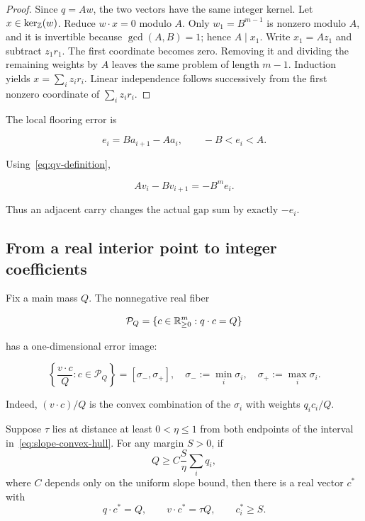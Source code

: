 \begin{proof}
  Since $q=Aw$, the two vectors have the same integer kernel.  Let
  $x\in\ker_{\mathbb{Z}}(w)$.  Reduce $w\cdot x=0$ modulo $A$.  Only
  $w_1=B^{m-1}$ is nonzero modulo $A$, and it is invertible because
  $\gcd(A,B)=1$; hence $A\mid x_1$.  Write $x_1=Az_1$ and subtract
  $z_1r_1$.  The first coordinate becomes zero.  Removing it and dividing the
  remaining weights by $A$ leaves the same problem of length $m-1$.  Induction
  yields $x=\sum_i z_ir_i$.  Linear independence follows successively from the
  first nonzero coordinate of $\sum_i z_ir_i$.
\end{proof}

The local flooring error is

\begin{equation}
  e_i=Ba_{i+1}-Aa_i,\qquad -B<e_i<A.
  \label{eq:local-error}
\end{equation}

Using~\eqref{eq:qv-definition},

\begin{equation}
  Av_i-Bv_{i+1}=-B^m e_i.
  \label{eq:carry-error}
\end{equation}

Thus an adjacent carry changes the actual gap sum by exactly $-e_i$.

\subsection{From a real interior point to integer coefficients}

Fix a main mass $Q$.  The nonnegative real fiber

\[
  \mathcal P_Q=\{c\in\mathbb{R}_{\ge0}^m:q\cdot c=Q\}
\]

has a one-dimensional error image:

\begin{equation}
  \left\{\frac{v\cdot c}{Q}:c\in\mathcal P_Q\right\}
  =[\sigma_-,\sigma_+],
  \quad
  \sigma_-:=\min_i\sigma_i,
  \quad
  \sigma_+:=\max_i\sigma_i.
  \label{eq:slope-convex-hull}
\end{equation}

Indeed, $(v\cdot c)/Q$ is the convex combination of the $\sigma_i$ with
weights $q_ic_i/Q$.

\begin{lemma}
  \label{lem:interior}
  Suppose $\tau$ lies at distance at least $0<\eta\le1$ from both endpoints of
  the interval in~\eqref{eq:slope-convex-hull}.  For any margin $S>0$, if
  \begin{equation}
    Q\ge C\frac{S}{\eta}\sum_iq_i,
    \label{eq:interior-mass}
  \end{equation}
  where $C$ depends only on the uniform slope bound, then there is a real
  vector $c^*$ with
  \[
    q\cdot c^*=Q,\qquad v\cdot c^*=\tau Q,\qquad c_i^*\ge S.
  \]
\end{lemma}

